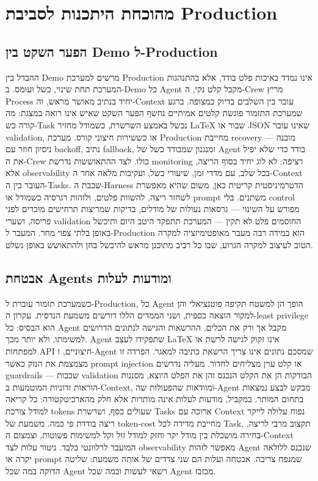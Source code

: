 \chapter{מהוכחת היתכנות לסביבת Production}
\section{הפער השקט בין Demo ל-Production}
ההבדל בין Demo מרשים למערכת Production אינו נמדד באיכות פלט בודד, אלא בהתנהגות המערכת תחת שינוי, כשל ועומס. ב-Demo כל Agent מקבל קלט נקי, ה-Crew מריץ Process יחיד בנתיב מאושר מראש, וה-Context עובר בין השלבים בדיוק כמצופה. ברגע שמערכת התזמור פוגשת קלטים אמיתיים נחשף הפער השקט שאיש אינו רואה במצגת: מה קורה כש-Task נכשל באמצע השרשרת, כשמודל מחזיר LaTeX שבור או JSON שאינו עובר validation, או כששירות חיצוני קורס. מערכת Production מחייבת recovery מובנה — ניסיון חוזר עם backoff, נתיב fallback, ומנגנון שמבודד כשל של Agent בודד כדי שלא יפיל את ה-Crew כולו. לצד ההתאוששות נדרשת monitoring רציפה: לא לוג יחיד בסוף הריצה, אלא observability בכל שלב, עם מדדי זמן, שיעורי כשל, ועקיבות מלאה אחר ה-Context העובר בין ה-Tasks. שכבת ה-Harness הדטרמיניסטית קריטית כאן, משום שהיא מאפשרת לשחזר ריצה, להשוות פלטים, ולזהות רגרסיה כשמודל או prompt משתנים. בלי control מפורש על השינוי — גרסאות נעולות של מודלים, בדיקות שמריצות תרחישים מוכרים לפני פריסה, ושערי validation החוסמים פלט לא תקין — המערכת תתפקד היטב היום ותיכשל באופן בלתי צפוי מחר. המעבר ל-Production הוא במידה רבה מעבר מאופטימיזציה למקרה הטוב לעיצוב למקרה הגרוע, שבו כל רכיב מתוכנן מראש להיכשל בחן ולהתאושש באופן נשלט.

\section{אבטחת Agents ומודעות לעלות}
כשמערכת תזמור עוברת ל-Production, כל Agent הופך הן למשטח תקיפה פוטנציאלי והן למקור הוצאה כספית, ושני הממדים הללו דורשים משמעת הנדסית. עקרון ה-least privilege הוא הבסיס: כל Agent מקבל אך ורק את הכלים, ההרשאות והגישה לנתונים הדרושים למשימתו, ולא יותר מכך. Agent שתפקידו לעצב LaTeX אינו זקוק לגישה לרשת או למפתחות API חיצוניים, ו-Agent שמסכם נתונים אינו צריך הרשאת כתיבה למאגר. הפרדה זו מצמצמת את הנזק כאשר prompt injection או קלט עוין מצליחים לחדור. מעליה נדרשים guardrails — שכבות validation הבודקות הן את הקלט הנכנס והן את הפלט היוצא, מסננות הוראות זדוניות המוטמעות ב-Context, ומוודאות שהפעולות שה-Agent מבקש לבצע נמצאות בתחום המותר. במקביל, מודעות לעלות אינה מותרות אלא חלק מהארכיטקטורה: כל קריאה למודל צורכת tokens שעולים כסף, ושרשרת Tasks ארוכה עם Context נפוח עלולה לייקר ריצה בודדת פי כמה. משמעת של token-cost מחייבת מדידה לכל Task, תקצוב מרבי לריצה, בחירה מושכלת בין מודל יקר וחזק למודל זול וקל למשימות פשוטות, וצמצום ה-Context המועבר לרלוונטי בלבד. ניטור עלות לצד observability מאפשר לזהות Agent שנכנס ללולאה יקרה או prompt שמנפח צריכה. אבטחה ועלות הם שני צדדים של אותה משמעת: שליטה הדוקה במה שכל Agent רשאי לעשות ובמה שכל Agent מבזבז.

